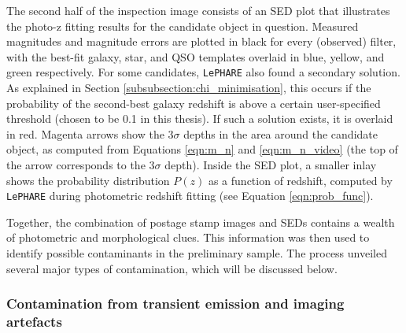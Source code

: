 The second half of the inspection image consists of an SED plot that illustrates the photo-z fitting results for the candidate object in question. Measured magnitudes and magnitude errors are plotted in black for every (observed) filter, with the best-fit galaxy, star, and QSO templates overlaid in blue, yellow, and green respectively. For some candidates, \texttt{LePHARE} also found a secondary solution. As explained in Section \ref{subsubsection:chi_minimisation}, this occurs if the probability of the second-best galaxy redshift is above a certain user-specified threshold (chosen to be 0.1 in this thesis). If such a solution exists, it is overlaid in red. Magenta arrows show the $3\sigma$ depths in the area around the candidate object, as computed from Equations \ref{eqn:m_n} and \ref{eqn:m_n_video} (the top of the arrow corresponds to the $3\sigma$ depth). Inside the SED plot, a smaller inlay shows the probability distribution $P(z)$ as a function of redshift, computed by \texttt{LePHARE} during photometric redshift fitting (see Equation \ref{eqn:prob_func}). \par

Together, the combination of postage stamp images and SEDs contains a wealth of photometric and morphological clues. This information was then used to identify possible contaminants in the preliminary sample. The process unveiled several major types of contamination, which will be discussed below. \par 




\subsubsection{Contamination from transient emission and imaging artefacts}\label{subsubsection:contamination_transients}

